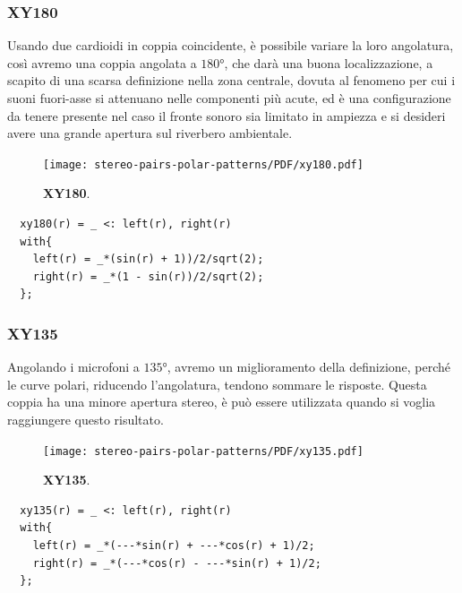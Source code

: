 \subsubsection*{XY180}
Usando due cardioidi in coppia coincidente, è possibile variare la loro
angolatura, così avremo una coppia angolata a $180°$, che darà una buona
localizzazione, a scapito di una scarsa definizione nella zona centrale,
dovuta al fenomeno per cui i suoni fuori-asse si attenuano nelle componenti più
acute, ed è una configurazione da tenere presente nel caso il fronte sonoro
sia limitato in ampiezza e si desideri avere una grande apertura sul
riverbero ambientale.
\begin{figure}[h]
\begin{center}
\texttt{[image: stereo-pairs-polar-patterns/PDF/xy180.pdf]}
\caption{\textbf{XY180}.}
\label{xy180}
\end{center}
\end{figure}
\begin{lstlisting}
  xy180(r) = _ <: left(r), right(r)
  with{
    left(r) = _*(sin(r) + 1))/2/sqrt(2);
    right(r) = _*(1 - sin(r))/2/sqrt(2);
  };
\end{lstlisting}
\subsubsection*{XY135}
Angolando i microfoni a $135°$, avremo un miglioramento
della definizione, perché le curve polari, riducendo l’angolatura, tendono
sommare le risposte. Questa coppia ha una minore apertura stereo, è può essere
utilizzata quando si voglia raggiungere questo risultato.
\begin{figure}[h]
\begin{center}
\texttt{[image: stereo-pairs-polar-patterns/PDF/xy135.pdf]}
\caption{\textbf{XY135}.}
\label{xy135}
\end{center}
\end{figure}
\begin{lstlisting}
  xy135(r) = _ <: left(r), right(r)
  with{
    left(r) = _*(---*sin(r) + ---*cos(r) + 1)/2;
    right(r) = _*(---*cos(r) - ---*sin(r) + 1)/2;
  };
\end{lstlisting}
